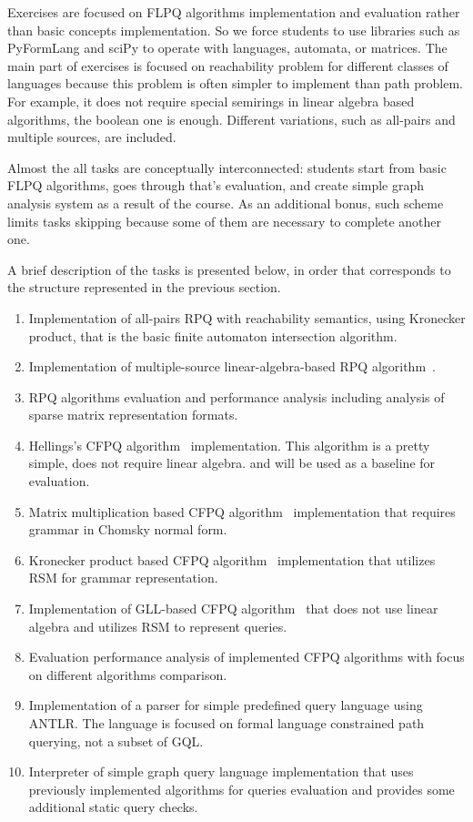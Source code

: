 \documentclass[sigconf]{acmart}
\begin{document}
Exercises are focused on FLPQ algorithms implementation and evaluation rather than basic concepts implementation.
So we force students to use libraries such as PyFormLang and sciPy to operate with languages, automata, or matrices.
The main part of exercises is focused on reachability problem for different classes of languages because this problem is often simpler to implement than path problem.
For example, it does not require special semirings in linear algebra based algorithms, the boolean one is enough.  
Different variations, such as all-pairs and multiple sources, are included.

Almost the all tasks are conceptually interconnected: students start from basic FLPQ algorithms, goes through that's evaluation, and create simple graph analysis system as a result of the course.
As an additional bonus, such scheme limits tasks skipping because some of them are necessary to complete another one.

A brief description of the tasks is presented below, in order that corresponds to the structure represented in the previous section.
\begin{enumerate}
  \item Implementation of all-pairs RPQ with reachability semantics, using Kronecker product, that is the basic finite automaton intersection algorithm.
  \item Implementation of multiple-source linear-algebra-based RPQ algorithm~\cite{belyanin2024singlesourceregularpathquerying}.%
  \item RPQ algorithms evaluation and performance analysis including analysis of sparse matrix representation formats.
  \item Hellings's CFPQ algorithm~\cite{conf/icdt/Hellings14} implementation. This algorithm is a pretty simple, does not require linear algebra. and will be used as a baseline for evaluation.
  \item Matrix multiplication based CFPQ algorithm~\cite{10.1145/3210259.3210264} implementation that requires grammar in Chomsky normal form.
  \item Kronecker product based CFPQ algorithm~\cite{10.1007/978-3-030-54832-2_6} implementation that utilizes RSM for grammar representation.
  \item Implementation of GLL-based CFPQ algorithm~\cite{abzalov2023gllbasedcontextfreepathquerying} that does not use linear algebra and utilizes RSM to represent queries. 
  \item Evaluation performance analysis of implemented CFPQ algorithms with focus on different algorithms comparison. 
  \item Implementation of a parser for simple predefined query language using ANTLR. The language is focused on formal language constrained path querying, not a subset of GQL.
  \item Interpreter of simple graph query language implementation that uses previously implemented algorithms for queries evaluation and provides some additional static query checks.
\end{enumerate}
\end{document}

